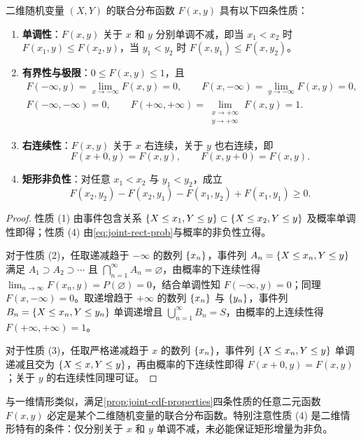\begin{proposition}[联合分布函数的基本性质]
\label{prop:joint-cdf-properties}
二维随机变量 $(X,Y)$ 的联合分布函数 $F(x,y)$ 具有以下四条性质：
\begin{enumerate}
  \item \textbf{单调性}：$F(x,y)$ 关于 $x$ 和 $y$ 分别单调不减，即当 $x_1<x_2$ 时 $F(x_1,y)\le F(x_2,y)$，当 $y_1<y_2$ 时 $F(x,y_1)\le F(x,y_2)$。
  \item \textbf{有界性与极限}：$0\le F(x,y)\le 1$，且
  \[
    \begin{gathered}
      F(-\infty,y)=\lim_{x\to-\infty}F(x,y)=0,\qquad
      F(x,-\infty)=\lim_{y\to-\infty}F(x,y)=0,\\
      F(-\infty,-\infty)=0,\qquad
      F(+\infty,+\infty)=\lim_{\substack{x\to+\infty\\ y\to+\infty}}F(x,y)=1.
    \end{gathered}
  \]
  \item \textbf{右连续性}：$F(x,y)$ 关于 $x$ 右连续，关于 $y$ 也右连续，即
  \[
    F(x+0,y)=F(x,y),\qquad F(x,y+0)=F(x,y).
  \]
  \item \textbf{矩形非负性}：对任意 $x_1<x_2$ 与 $y_1<y_2$，成立
  \[
    F(x_2,y_2)-F(x_2,y_1)-F(x_1,y_2)+F(x_1,y_1)\ge 0.
  \]
\end{enumerate}
\end{proposition}
\begin{proof}
性质 (1) 由事件包含关系 $\{X\le x_1,Y\le y\}\subset\{X\le x_2,Y\le y\}$ 及概率单调性即得；性质 (4) 由\eqref{eq:joint-rect-prob}与概率的非负性立得。

对于性质 (2)，任取递减趋于 $-\infty$ 的数列 $\{x_n\}$，事件列 $A_n=\{X\le x_n,Y\le y\}$ 满足 $A_1\supset A_2\supset\cdots$ 且 $\bigcap_{n=1}^{\infty}A_n=\varnothing$，由概率的下连续性得 $\lim_{n\to\infty}F(x_n,y)=P(\varnothing)=0$，结合单调性知 $F(-\infty,y)=0$；同理 $F(x,-\infty)=0$。取递增趋于 $+\infty$ 的数列 $\{x_n\}$ 与 $\{y_n\}$，事件列 $B_n=\{X\le x_n,Y\le y_n\}$ 单调递增且 $\bigcup_{n=1}^{\infty}B_n=S$，由概率的上连续性得 $F(+\infty,+\infty)=1$。

对于性质 (3)，任取严格递减趋于 $x$ 的数列 $\{x_n\}$，事件列 $\{X\le x_n,Y\le y\}$ 单调递减且交为 $\{X\le x,Y\le y\}$，再由概率的下连续性即得 $F(x+0,y)=F(x,y)$；关于 $y$ 的右连续性同理可证。
\end{proof}

与一维情形类似，满足\cref{prop:joint-cdf-properties}四条性质的任意二元函数 $F(x,y)$ 必定是某个二维随机变量的联合分布函数。特别注意性质 (4) 是二维情形特有的条件：仅分别关于 $x$ 和 $y$ 单调不减，未必能保证矩形增量为非负。

